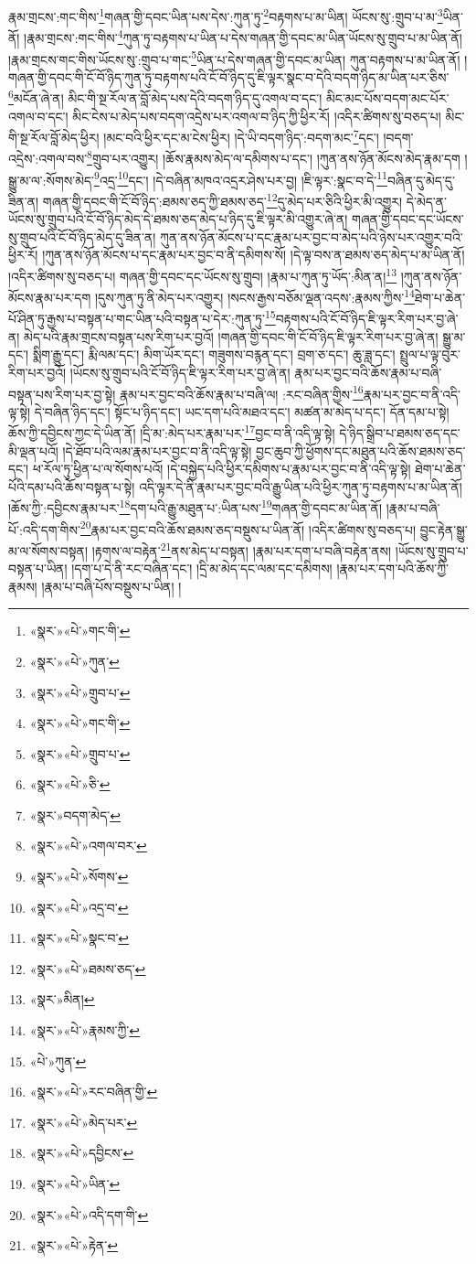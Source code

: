 རྣམ་གྲངས་:གང་གིས་\footnote{«སྣར་»«པེ་»གང་གི་}གཞན་གྱི་དབང་ཡིན་པས་དེས་:ཀུན་ཏུ་\footnote{«སྣར་»«པེ་»ཀུན་}བརྟགས་པ་མ་ཡིན། ཡོངས་སུ་:གྲུབ་པ་མ་\footnote{«སྣར་»«པེ་»གྲུབ་པ་}ཡིན་ནོ། །རྣམ་གྲངས་:གང་གིས་\footnote{«སྣར་»«པེ་»གང་གི་}ཀུན་ཏུ་བརྟགས་པ་ཡིན་པ་དེས་གཞན་གྱི་དབང་མ་ཡིན་ཡོངས་སུ་གྲུབ་པ་མ་ཡིན་ནོ། །རྣམ་གྲངས་གང་གིས་ཡོངས་སུ་:གྲུབ་པ་གང་\footnote{«སྣར་»«པེ་»གྲུབ་པ་}ཡིན་པ་དེས་གཞན་གྱི་དབང་མ་ཡིན། ཀུན་བརྟགས་པ་མ་ཡིན་ནོ། །གཞན་གྱི་དབང་གི་ངོ་བོ་ཉིད་ཀུན་ཏུ་བརྟགས་པའི་ངོ་བོ་ཉིད་དུ་ཇི་ལྟར་སྣང་བ་དེའི་བདག་ཉིད་མ་ཡིན་པར་ཅིས་\footnote{«སྣར་»«པེ་»ཅི་}མངོན་ཞེ་ན། མིང་གི་སྔ་རོལ་ན་བློ་མེད་པས་དེའི་བདག་ཉིད་དུ་འགལ་བ་དང་། མིང་མང་པོས་བདག་མང་པོར་འགལ་བ་དང་། མིང་ངེས་པ་མེད་པས་བདག་འདྲེས་པར་འགལ་བ་ཉིད་ཀྱི་ཕྱིར་རོ། །འདིར་ཚིགས་སུ་བཅད་པ། མིང་གི་སྔ་རོལ་བློ་མེད་ཕྱིར། །མང་བའི་ཕྱིར་དང་མ་ངེས་ཕྱིར། །དེ་ཡི་བདག་ཉིད་:བདག་མང་\footnote{«སྣར་»བདག་མེད་}དང་། །བདག་འདྲེས་:འགལ་བས་\footnote{«སྣར་»«པེ་»འགལ་བར་}གྲུབ་པར་འགྱུར། །ཆོས་རྣམས་མེད་ལ་དམིགས་པ་དང་། །ཀུན་ནས་ཉོན་མོངས་མེད་རྣམ་དག །སྒྱུ་མ་ལ་:སོགས་མེད་\footnote{«སྣར་»«པེ་»སོགས་}འདྲ་\footnote{«སྣར་»«པེ་»འདྲ་བ་}དང་། །དེ་བཞིན་མཁའ་འདྲར་ཤེས་པར་བྱ། །ཇི་ལྟར་:སྣང་བ་དེ་\footnote{«སྣར་»«པེ་»སྣང་བ་}བཞིན་དུ་མེད་དུ་ཟིན་ན། གཞན་གྱི་དབང་གི་ངོ་བོ་ཉིད་:ཐམས་ཅད་ཀྱི་ཐམས་ཅད་\footnote{«སྣར་»«པེ་»ཐམས་ཅད་}དུ་མེད་པར་ཅིའི་ཕྱིར་མི་འགྱུར། དེ་མེད་ན་ཡོངས་སུ་གྲུབ་པའི་ངོ་བོ་ཉིད་མེད་དེ་ཐམས་ཅད་མེད་པ་ཉིད་དུ་ཇི་ལྟར་མི་འགྱུར་ཞེ་ན། གཞན་གྱི་དབང་དང་ཡོངས་སུ་གྲུབ་པའི་ངོ་བོ་ཉིད་མེད་དུ་ཟིན་ན། ཀུན་ནས་ཉོན་མོངས་པ་དང་རྣམ་པར་བྱང་བ་མེད་པའི་ཉེས་པར་འགྱུར་བའི་ཕྱིར་རོ། །ཀུན་ནས་ཉོན་མོངས་པ་དང་རྣམ་པར་བྱང་བ་ནི་དམིགས་སོ། །དེ་ལྟ་བས་ན་ཐམས་ཅད་མེད་པ་མ་ཡིན་ནོ། །འདིར་ཚིགས་སུ་བཅད་པ། གཞན་གྱི་དབང་དང་ཡོངས་སུ་གྲུབ། །རྣམ་པ་ཀུན་ཏུ་ཡོད་:མིན་ན།\footnote{«སྣར་»མིན།} །ཀུན་ནས་ཉོན་མོངས་རྣམ་པར་དག །དུས་ཀུན་ཏུ་ནི་མེད་པར་འགྱུར། །སངས་རྒྱས་བཅོམ་ལྡན་འདས་:རྣམས་ཀྱིས་\footnote{«སྣར་»«པེ་»རྣམས་ཀྱི་}ཐེག་པ་ཆེན་པོ་ཤིན་ཏུ་རྒྱས་པ་བསྟན་པ་གང་ཡིན་པའི་བསྟན་པ་དེར་:ཀུན་ཏུ་\footnote{«པེ་»ཀུན་}བརྟགས་པའི་ངོ་བོ་ཉིད་ཇི་ལྟར་རིག་པར་བྱ་ཞེ་ན། མེད་པའི་རྣམ་གྲངས་བསྟན་པས་རིག་པར་བྱའོ། །གཞན་གྱི་དབང་གི་ངོ་བོ་ཉིད་ཇི་ལྟར་རིག་པར་བྱ་ཞེ་ན། སྒྱུ་མ་དང་། སྨིག་རྒྱུ་དང་། རྨི་ལམ་དང་། མིག་ཡོར་དང་། གཟུགས་བརྙན་དང་། བྲག་ཅ་དང་། ཆུ་ཟླ་དང་། སྤྲུལ་པ་ལྟ་བུར་རིག་པར་བྱའོ། །ཡོངས་སུ་གྲུབ་པའི་ངོ་བོ་ཉིད་ཇི་ལྟར་རིག་པར་བྱ་ཞེ་ན། རྣམ་པར་བྱང་བའི་ཆོས་རྣམ་པ་བཞི་བསྟན་པས་རིག་པར་བྱ་སྟེ། རྣམ་པར་བྱང་བའི་ཆོས་རྣམ་པ་བཞི་ལ། :རང་བཞིན་གྱིས་\footnote{«སྣར་»«པེ་»རང་བཞིན་གྱི་}རྣམ་པར་བྱང་བ་ནི་འདི་ལྟ་སྟེ། དེ་བཞིན་ཉིད་དང་། སྟོང་པ་ཉིད་དང་། ཡང་དག་པའི་མཐའ་དང་། མཚན་མ་མེད་པ་དང་། དོན་དམ་པ་སྟེ། ཆོས་ཀྱི་དབྱིངས་ཀྱང་དེ་ཡིན་ནོ། །དྲི་མ་:མེད་པར་རྣམ་པར་\footnote{«སྣར་»«པེ་»མེད་པར་}བྱང་བ་ནི་འདི་ལྟ་སྟེ། དེ་ཉིད་སྒྲིབ་པ་ཐམས་ཅད་དང་མི་ལྡན་པའོ། །དེ་ཐོབ་པའི་ལམ་རྣམ་པར་བྱང་བ་ནི་འདི་ལྟ་སྟེ། བྱང་ཆུབ་ཀྱི་ཕྱོགས་དང་མཐུན་པའི་ཆོས་ཐམས་ཅད་དང་། ཕ་རོལ་ཏུ་ཕྱིན་པ་ལ་སོགས་པའོ། །དེ་བསྐྱེད་པའི་ཕྱིར་དམིགས་པ་རྣམ་པར་བྱང་བ་ནི་འདི་ལྟ་སྟེ། ཐེག་པ་ཆེན་པོའི་དམ་པའི་ཆོས་བསྟན་པ་སྟེ། འདི་ལྟར་དེ་ནི་རྣམ་པར་བྱང་བའི་རྒྱུ་ཡིན་པའི་ཕྱིར་ཀུན་ཏུ་བརྟགས་པ་མ་ཡིན་ནོ། །ཆོས་ཀྱི་:དབྱིངས་རྣམ་པར་\footnote{«སྣར་»«པེ་»དབྱིངས་}དག་པའི་རྒྱུ་མཐུན་པ་:ཡིན་པས་\footnote{«སྣར་»«པེ་»ཡིན་}གཞན་གྱི་དབང་མ་ཡིན་ནོ། །རྣམ་པ་བཞི་པོ་:འདི་དག་གིས་\footnote{«སྣར་»«པེ་»འདི་དག་གི་}རྣམ་པར་བྱང་བའི་ཆོས་ཐམས་ཅད་བསྡུས་པ་ཡིན་ནོ། །འདིར་ཚིགས་སུ་བཅད་པ། བྱུང་རྟེན་སྒྱུ་མ་ལ་སོགས་བསྟན། །རྟགས་ལ་བརྟེན་\footnote{«སྣར་»«པེ་»རྟེན་}ནས་མེད་པ་བསྟན། །རྣམ་པར་དག་པ་བཞི་བརྟེན་ནས། །ཡོངས་སུ་གྲུབ་པ་བསྟན་པ་ཡིན། །དག་པ་དེ་ནི་རང་བཞིན་དང་། །དྲི་མ་མེད་དང་ལམ་དང་དམིགས། །རྣམ་པར་དག་པའི་ཆོས་ཀྱི་རྣམས། །རྣམ་པ་བཞི་པོས་བསྡུས་པ་ཡིན། །
